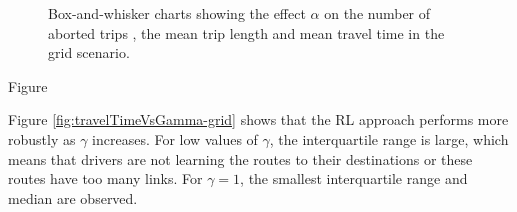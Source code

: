 \documentclass{RITA}
\begin{document}
\begin{figure}[ht]
  \centering
  \caption{Box-and-whisker charts showing the effect $\alpha$ on the number of aborted trips , the mean trip length  and mean travel time  in the grid scenario.}
  \label{fig:qLearningParams-grid}
\end{figure}

Figure 



Figure \ref{fig:travelTimeVsGamma-grid} shows that the RL approach performs more robustly as $\gamma$ increases. For low values of $\gamma$, the interquartile range is large, which means that drivers are not learning the routes to their destinations or these routes have too many links. For $\gamma = 1$, the smallest interquartile range and median are observed.
\end{document}

